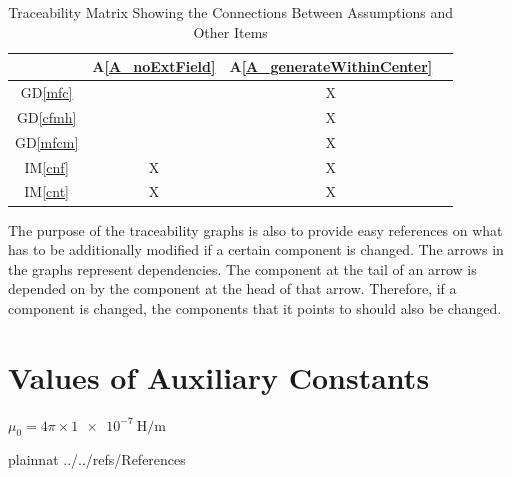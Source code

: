 \documentclass[12pt]{article}
\newcommand{\dref}[1]{GD\ref{#1}}
\newcommand{\aref}[1]{A\ref{#1}}
\newcommand{\iref}[1]{IM\ref{#1}}
\begin{document}
\begin{table}[H]
\centering
\begin{tabular}{|c|c|c|c|}
\hline
& \aref{A_noExtField}& \aref{A_generateWithinCenter} \\
\hline
\dref{mfc}       & & X  \\ \hline
\dref{cfmh}      & & X\\ \hline
\dref{mfcm}      & & X\\ \hline
\iref{cnf}       & X& X  \\ \hline
\iref{cnt}       & X& X\\
\hline
\end{tabular}
\caption{Traceability Matrix Showing the Connections Between Assumptions and Other Items}
\label{Table:A_trace}
\end{table}


The purpose of the traceability graphs is also to provide easy references on
what has to be additionally modified if a certain component is changed.  The
arrows in the graphs represent dependencies. The component at the tail of an
arrow is depended on by the component at the head of that arrow. Therefore, if a
component is changed, the components that it points to should also be
changed.




\section{Values of Auxiliary Constants}\label{AuxiliaryConstants}
{
$\mu_0 = 4\pi \times \SI{1e-7}{\henry\per\meter}$
}

\newpage

 {plainnat}
 {../../refs/References}

\newpage
\end{document}
